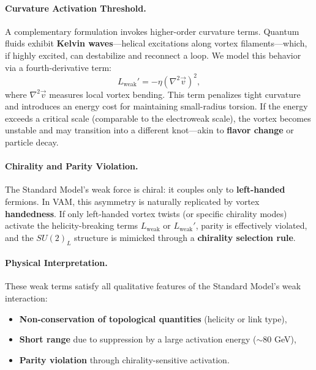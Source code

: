 \documentclass[a4paper,12pt]{article}
\begin{document}
\vspace{0.5em}
\paragraph{Curvature Activation Threshold.}
A complementary formulation invokes higher-order curvature terms. Quantum fluids exhibit \textbf{Kelvin waves}—helical excitations along vortex filaments—which, if highly excited, can destabilize and reconnect a loop. We model this behavior via a fourth-derivative term:
\begin{equation}
    L_{\text{weak}}' = -\eta \left( \nabla^2 \vec{v} \right)^2,
    \label{eq:kelvin-wave-term}
\end{equation}
where \( \nabla^2 \vec{v} \) measures local vortex bending. This term penalizes tight curvature and introduces an energy cost for maintaining small-radius torsion. If the energy exceeds a critical scale (comparable to the electroweak scale), the vortex becomes unstable and may transition into a different knot—akin to \textbf{flavor change} or particle decay.

\vspace{0.5em}
\paragraph{Chirality and Parity Violation.}
The Standard Model’s weak force is chiral: it couples only to \textbf{left-handed} fermions. In VAM, this asymmetry is naturally replicated by vortex \textbf{handedness}. If only left-handed vortex twists (or specific chirality modes) activate the helicity-breaking terms \( L_{\text{weak}} \) or \( L_{\text{weak}}' \), parity is effectively violated, and the \( SU(2)_L \) structure is mimicked through a \textbf{chirality selection rule}.

\vspace{0.5em}
\paragraph{Physical Interpretation.}
These weak terms satisfy all qualitative features of the Standard Model’s weak interaction:
\begin{itemize}
    \item \textbf{Non-conservation of topological quantities} (helicity or link type),
    \item \textbf{Short range} due to suppression by a large activation energy (\( \sim 80 \) GeV),
    \item \textbf{Parity violation} through chirality-sensitive activation.
\end{itemize}
\end{document}
